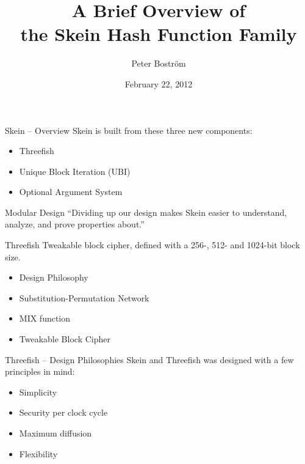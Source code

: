 \documentclass{beamer}
\title[The Skein Hash Function Family]{A Brief Overview of\\the Skein Hash Function Family}
\author{Peter Boström}
\institute{Royal Institute of Technology (RIOT)}
\date{February 22, 2012}
\begin{document}
\begin{frame}
	\titlepage
\end{frame}

\begin{frame}{Skein -- Overview}
	Skein is built from these three new components:
	\vspace{4mm}
	\begin{itemize}
		\item Threefish
		\item Unique Block Iteration (UBI)
		\item Optional Argument System
	\end{itemize}
	\vspace{12mm}
	\begin{block}{Modular Design}
		``Dividing up our design makes Skein easier to understand, analyze, and prove properties about.''
	\end{block}
\end{frame}

\begin{frame}{Threefish}
	Tweakable block cipher, defined with a 256-, 512- and 1024-bit block size.
	\vspace{2mm}
	\begin{itemize}
		\item Design Philosophy
		\item Substitution-Permutation Network
		\item MIX function
		\item Tweakable Block Cipher
	\end{itemize}
\end{frame}

\begin{frame}{Threefish -- Design Philosophies}
	Skein and Threefish was designed with a few principles in mind:
	\vspace{2mm}
	\begin{itemize}
		\item Simplicity
		\item Security per clock cycle
		\item Maximum diffusion
		\item Flexibility
	\end{itemize}
\end{frame}
\end{document}
